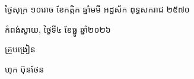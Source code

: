 \documentclass[a4paper,10pt]{article}
\begin{document}
\vspace{6pt}
{\centering
\hspace*{5.2cm}\begin{minipage}{11.5cm}
  \centering
  ថ្ងៃសុក្រ ១០រោច ខែកត្តិក ឆ្នាំមមី អដ្ឋស័ក ពុទ្ធសករាជ ២៥៧០\par
  កំពង់ស្វាយ, ថ្ងៃទី៤ ខែធ្នូ ឆ្នាំ២០២៦\par
  \vspace{2pt}
  {\muol គ្រូបង្រៀន\par}
  \vspace{32pt}
  \hfill{\muol ហុក ប៊ុនថែន}\hspace*{1.4cm}
\end{minipage}\par}
\end{document}
